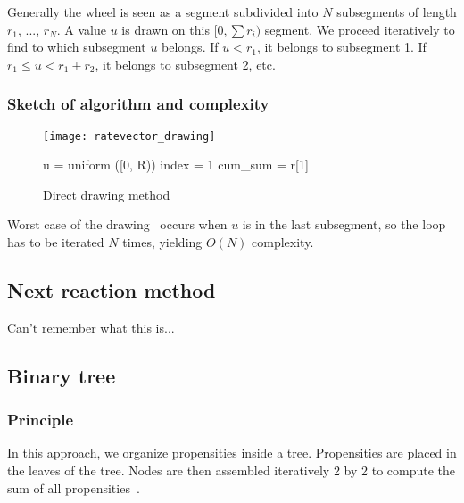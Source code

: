 Generally the wheel is seen as a segment subdivided into $N$ subsegments of length $r_1$, ..., $r_N$. A value $u$ is drawn on this $[0, \sum r_i)$ segment. We proceed iteratively to find to which subsegment $u$ belongs. If $u < r_1$, it belongs to subsegment 1. If $r_1 \leq u < r_1+r_2$, it belongs to subsegment 2, etc.

\subsubsection {Sketch of algorithm and complexity} 

\begin{figure}[!h]
  \begin{minipage}{0.5\textwidth}
    \texttt{[image: ratevector\_drawing]}
  \end{minipage}
  \begin{minipage}{0.5\textwidth}
    \begin{algorithm}[H]
      u = uniform ([0, R))\;
        index = 1\;
        cum\_sum = r[1]\;
    \end{algorithm}
  \end{minipage}
  \caption{Direct drawing method}
  \label{fig:direct_search}
\end {figure}

Worst case of the drawing~ occurs when $u$ is in the last subsegment, so the loop has to be iterated $N$ times, yielding $O(N)$ complexity.

\subsection {Next reaction method}

Can't remember what this is...

\subsection {Binary tree}

\subsubsection {Principle}

In this approach, we organize propensities inside a tree. Propensities are placed in the leaves of the tree. Nodes are then assembled iteratively 2 by 2 to compute the sum of all propensities~.

